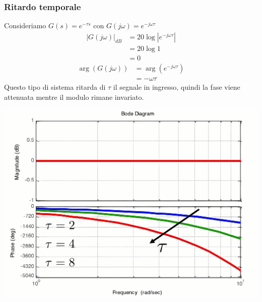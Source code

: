 \documentclass{article}
\numberwithin{equation}{subsection}
\begin{document}
\subsubsection{Ritardo temporale}
Consideriamo $G(s) = e^{-\tau s}$ con $G(j\omega) = e^{-j \omega\tau }$
\begin{align*}
    |G(j\omega)|_{dB} &= 20 \log |e^{-j \omega\tau}|\\
    &= 20 \log 1\\
    &=0
\end{align*}
\begin{align*}
    \arg(G(j\omega)) &= \arg(e^{-j\omega\tau})\\
    &= - \omega\tau
\end{align*}
Questo tipo di sistema ritarda di $\tau$ il segnale in ingresso, quindi la fase viene attenuata mentre il modulo rimane invariato.
\begin{center}
    \includegraphics[scale=0.15]{Images/Diagramma_rit_temp.png}
\end{center}
\end{document}
